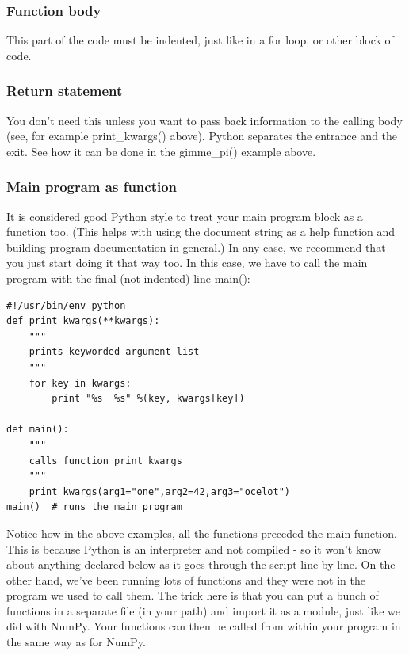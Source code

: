 \documentclass[11pt]{book}
\begin{document}
{{{{ \subsubsection{Function body}
 This part of the code must be indented, just like in a for loop, or other block of code.

 \subsubsection{Return statement}
 You don't need this unless you want to pass back information to the calling body (see, for example {\color{blue}print\_kwargs()} above).  Python separates the entrance and the exit.  See how it can be done in the {\color{blue}gimme\_pi()} example above.

 \subsubsection{Main program as function}

 It is considered good Python style to treat your main program block as a function too.  (This helps with using the document string as a help function and building program documentation in general.)  In any case, we recommend that you just start doing it that way too.  In this case,  we have to call the main program with the final (not indented) line {\color{blue}main()}:

{ \color{blue} \begin{verbatim}
#!/usr/bin/env python
def print_kwargs(**kwargs):
    """
    prints keyworded argument list
    """
    for key in kwargs:
        print "%s  %s" %(key, kwargs[key])

def main():
    """
    calls function print_kwargs
    """
    print_kwargs(arg1="one",arg2=42,arg3="ocelot")
main()  # runs the main program
\end{verbatim}}

Notice how in the above examples, all the functions preceded the main function.  This is because Python is an interpreter and not compiled - so it won't know about anything declared below as it goes through the script line by line.   On the other hand, we've been running lots of functions and they were not in the program we used to call them.  The trick here is that
you can put a bunch of functions in a separate file (in your path) and import it as a module, just like we did with {\color{blue}NumPy}.  Your functions can then be called from within your program in the same way as for {\color{blue}NumPy}.

}}}}
\end{document}

